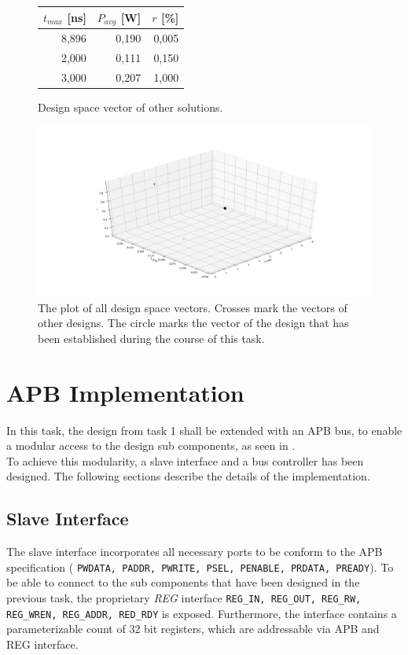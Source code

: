 \documentclass[%
	a4paper,
]
{article}
\begin{document}
\begin{figure}[h]
    \begin{center}
        \begin{tabular}{ r r r }
        \hline\hline
        $t_{max}$ [ns] & $P_{avg}$ [W] & $r$ [\%] \\
        \hline\hline
            8,896   & 0,190  & 0,005  \\
            2,000   & 0,111  & 0,150  \\
            3,000   & 0,207  & 1,000  \\
        \hline\hline 
        \end{tabular}
    \end{center}
    \label{tab:results}
    \caption{Design space vector of other solutions.}
\end{figure}



\begin{figure}[h!]
 \includegraphics[width = \textwidth]{fig/3dplot.png}
 \caption{The plot of all design space vectors. Crosses mark the vectors of other designs. The circle marks the vector of the design that has been established during the course of this task.}
 \label{fig:3dplot}
\end{figure}


\section{APB Implementation}
In this task, the design from task 1 shall be extended with an APB bus, to enable  a modular access to the design sub components, as seen in . \\
To achieve this modularity, a slave interface and a bus controller has been designed. The following sections describe the details of the implementation.

\subsection{Slave Interface}
The slave interface incorporates all necessary ports to be conform to the APB specification ( \lstinline[breaklines = true]{PWDATA, PADDR, PWRITE, PSEL, PENABLE, PRDATA, PREADY}). To be able to connect to the sub components that have been designed in the previous task, the proprietary \textit{REG} interface \lstinline[breaklines = true]{REG_IN, REG_OUT, REG_RW, REG_WREN, REG_ADDR, RED_RDY} is exposed. Furthermore, the interface contains a parameterizable count of 32 bit registers, which are addressable via APB and REG interface. 
\end{document}
